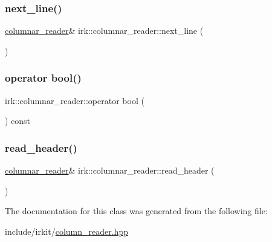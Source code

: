 \mbox{\label{classirk_1_1columnar__reader_a543757a48878cad7907736d1a2608bea}} 
\subsubsection{\texorpdfstring{next\+\_\+line()}{next\_line()}}
{\footnotesize\ttfamily \mbox{\hyperlink{classirk_1_1columnar__reader}{columnar\+\_\+reader}}\& irk\+::columnar\+\_\+reader\+::next\+\_\+line (\begin{DoxyParamCaption}{ }\end{DoxyParamCaption})\hspace{0.3cm}{\ttfamily [inline]}}

\mbox{\label{classirk_1_1columnar__reader_aad00b13b59559e7be029d7cc0766cd0f}} 
\subsubsection{\texorpdfstring{operator bool()}{operator bool()}}
{\footnotesize\ttfamily irk\+::columnar\+\_\+reader\+::operator bool (\begin{DoxyParamCaption}{ }\end{DoxyParamCaption}) const\hspace{0.3cm}{\ttfamily [inline]}}

\mbox{\label{classirk_1_1columnar__reader_ac4d65bada006d0b99b569c15e6001a6e}} 
\subsubsection{\texorpdfstring{read\+\_\+header()}{read\_header()}}
{\footnotesize\ttfamily \mbox{\hyperlink{classirk_1_1columnar__reader}{columnar\+\_\+reader}}\& irk\+::columnar\+\_\+reader\+::read\+\_\+header (\begin{DoxyParamCaption}{ }\end{DoxyParamCaption})\hspace{0.3cm}{\ttfamily [inline]}}



The documentation for this class was generated from the following file\+:\begin{DoxyCompactItemize}
\item 
include/irkit/\mbox{\hyperlink{column__reader_8hpp}{column\+\_\+reader.\+hpp}}\end{DoxyCompactItemize}
